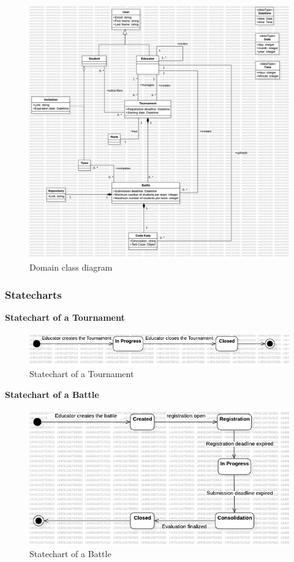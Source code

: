 \begin{figure}[H]
    \centering
    \includegraphics[width=1\textwidth]{Diagrams/DomainClassDiagram.jpg}
    \caption{Domain class diagram}
    \label{fig:domain_class_diagram}
\end{figure}

\subsubsection{Statecharts}

\textbf{Statechart of a Tournament}
\begin{figure}[H]
    \centering
    \includegraphics[width=1\textwidth]{Diagrams/TournamentStateChart.jpg}
    \caption{Statechart of a Tournament}
    \label{fig:statechart_tournament}
\end{figure}
\textbf{Statechart of a Battle}
\begin{figure}[H]
    \centering
    \includegraphics[width=1\textwidth]{Diagrams/BattleStateChart.jpg}
    \caption{Statechart of a Battle}
    \label{fig:statechart_battle}
\end{figure}